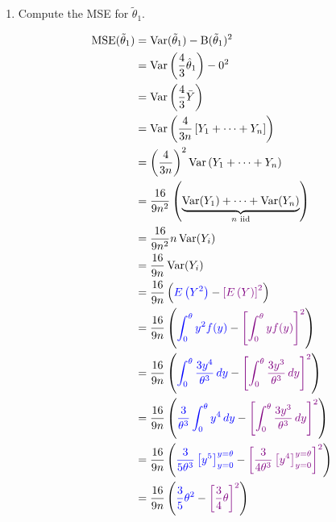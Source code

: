 \documentclass[12pt]{article}
\newcommand{\pars}[1]{\left( {#1} \right) }
\newcommand{\brac}[1]{\left[ {#1} \right] }
\newcommand{\ybar}{\bar{Y}}
\newcommand{\E}[1]{E\left( {#1} \right)}
\newcommand*{\Var}[1]{\operatorname{Var}(#1)}
\begin{document}
\begin{enumerate}
\begin{enumerate}
        
        \newpage
        \item
        Compute the MSE for $\tilde{\theta}_1$.
        \begin{mybox}
                \begin{align}
                    \operatorname{MSE}(\tilde{\theta}_1) &= \Var{\tilde{\theta}_1} - \operatorname{B}(\tilde{\theta}_1)^2 \notag \\
                    &=  \operatorname{Var}\pars{\frac{4}{3}\hat{\theta}_1} - 0^2 \notag \\
                    &=  \operatorname{Var}\pars{\frac{4}{3}\ybar} \notag \\
                    &= \operatorname{Var}\pars{\frac{4}{3n}\brac{Y_1 + \cdots + Y_n}} \notag\\
                    &= \pars{\frac{4}{3n}}^2 \operatorname{Var}\pars{Y_1 + \cdots + Y_n} \notag\\
                    &= \frac{16}{9n^2} \pars{\underbrace{\operatorname{Var}(Y_1) +\cdots+ \operatorname{Var}(Y_n)}_{n \text{ iid}}} \notag\\
                    &= \frac{16}{9n^2} n\operatorname{Var}(Y_i) \notag\\
                    &= \frac{16}{9n} \operatorname{Var}(Y_i) \notag\\
                    &= \frac{16}{9n}  \pars{ \color{blue}\E{Y^2}\color{black} - \color{violet}\brac{\E{Y}}^2 \color{black}}\notag\\
                    &= \frac{16}{9n}  \pars{ \color{blue}\int_{0}^{\theta} y^2 f(y) \color{black}-\color{violet} \brac{\int_{0}^{\theta} y f(y)}^2 \color{black}}\notag\\
                    &= \frac{16}{9n}  \pars{ \color{blue}\int_{0}^{\theta} \frac{3y^4}{\theta^3}\,dy \color{black}-\color{violet}\brac{ \int_{0}^{\theta} \frac{3y^3}{\theta^3}\,dy}^2\color{black}}\notag\\
                    &= \frac{16}{9n}  \pars{ \color{blue} \frac{3}{\theta^3}\int_{0}^{\theta} y^4\,dy \color{black}-\color{violet}\brac{\int_{0}^{\theta} \frac{3y^3}{\theta^3}\,dy}^2\color{black}}\notag\\
                    &= \frac{16}{9n}  \pars{ \color{blue} \frac{3}{5\theta^3} \brac{y^5}_{y=0}^{y=\theta} \color{black}-\color{violet} \brac{\frac{3}{4\theta^3} \brac{y^4}_{y=0}^{y=\theta}}^2\color{black}}\notag\\
                    &= \frac{16}{9n}  \pars{ \color{blue} \frac{3}{5}\theta^2 \color{black}-\color{violet}\brac{\frac{3}{4}\theta}^2 \color{black}}\notag\\

\end{align}
\end{mybox}
\end{enumerate}
\end{enumerate}
\end{document}
